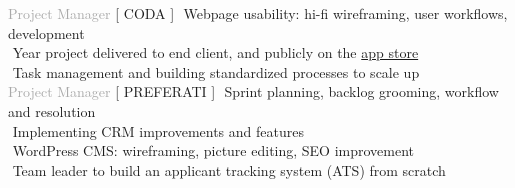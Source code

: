 \begin{cvtable}
{\textcolor{darkgray}{Project Manager}}%
{[ {C\scriptsize ODA} ]}%
{%
    \textperiodcentered $ $ 
    Webpage usability: 
    hi-fi wireframing, 
    user workflows, %
    development
    \\
\textperiodcentered $ $ Year project delivered to end client, and publicly on the \href{https://apps.apple.com/app/dorotea-subastas/id1608944514}{app store}
\\
     \textperiodcentered $ $ Task management and building standardized processes to scale up \\
}
% 
% 
{\textcolor{darkgray}{%
Project Manager}}%
{[ {P\scriptsize REFERATI} ]}%
{%
     \textperiodcentered $ $ Sprint planning, backlog grooming, workflow and resolution \\
     \textperiodcentered $ $ Implementing CRM improvements and features \\
     \textperiodcentered $ $ WordPress CMS: wireframing, picture editing, SEO improvement \\
     \textperiodcentered $ $ Team leader to build an applicant tracking system (ATS) from scratch\\
}
\end{cvtable}
